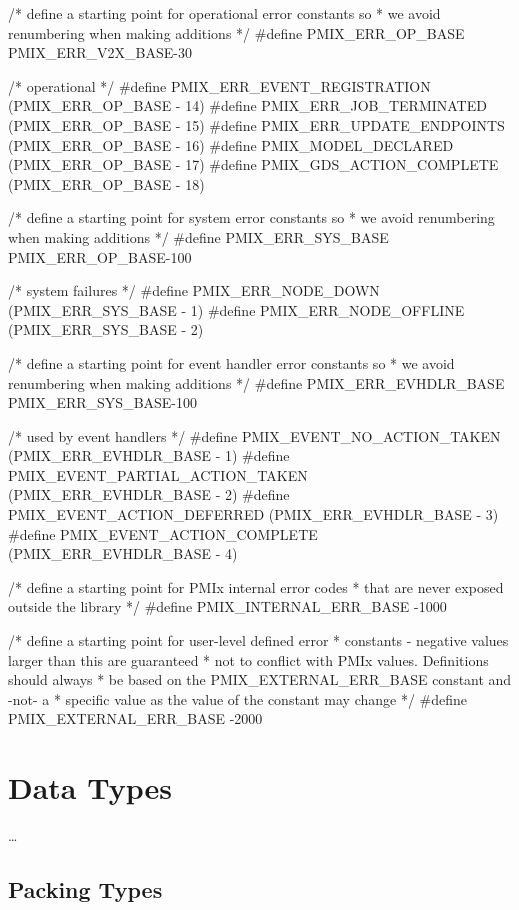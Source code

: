 \begin{codepar}
/* define a starting point for operational error constants so
 * we avoid renumbering when making additions */
#define PMIX_ERR_OP_BASE    PMIX_ERR_V2X_BASE-30

/* operational */
#define PMIX_ERR_EVENT_REGISTRATION             (PMIX_ERR_OP_BASE - 14)
#define PMIX_ERR_JOB_TERMINATED                 (PMIX_ERR_OP_BASE - 15)
#define PMIX_ERR_UPDATE_ENDPOINTS               (PMIX_ERR_OP_BASE - 16)
#define PMIX_MODEL_DECLARED                     (PMIX_ERR_OP_BASE - 17)
#define PMIX_GDS_ACTION_COMPLETE                (PMIX_ERR_OP_BASE - 18)

/* define a starting point for system error constants so
 * we avoid renumbering when making additions */
#define PMIX_ERR_SYS_BASE    PMIX_ERR_OP_BASE-100

/* system failures */
#define PMIX_ERR_NODE_DOWN                      (PMIX_ERR_SYS_BASE -  1)
#define PMIX_ERR_NODE_OFFLINE                   (PMIX_ERR_SYS_BASE -  2)


/* define a starting point for event handler error constants so
 * we avoid renumbering when making additions */
#define PMIX_ERR_EVHDLR_BASE    PMIX_ERR_SYS_BASE-100

/* used by event handlers */
#define PMIX_EVENT_NO_ACTION_TAKEN              (PMIX_ERR_EVHDLR_BASE -  1)
#define PMIX_EVENT_PARTIAL_ACTION_TAKEN         (PMIX_ERR_EVHDLR_BASE -  2)
#define PMIX_EVENT_ACTION_DEFERRED              (PMIX_ERR_EVHDLR_BASE -  3)
#define PMIX_EVENT_ACTION_COMPLETE              (PMIX_ERR_EVHDLR_BASE -  4)

/* define a starting point for PMIx internal error codes
 * that are never exposed outside the library */
#define PMIX_INTERNAL_ERR_BASE          -1000

/* define a starting point for user-level defined error
 * constants - negative values larger than this are guaranteed
 * not to conflict with PMIx values. Definitions should always
 * be based on the PMIX_EXTERNAL_ERR_BASE constant and -not- a
 * specific value as the value of the constant may change */
#define PMIX_EXTERNAL_ERR_BASE           -2000
\end{codepar}
\cspecificend


\section{Data Types}

\ldots

\subsection{Packing Types}

